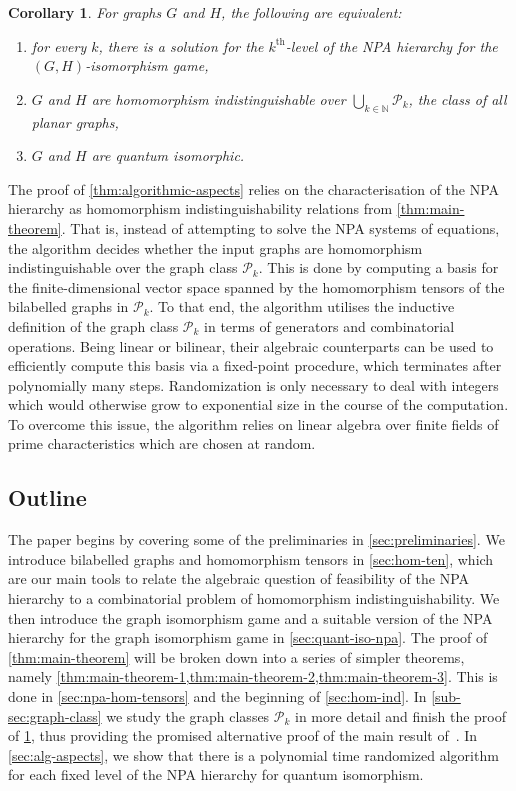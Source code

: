 \documentclass[11pt,a4paper]{article}
\theoremstyle{plain}
\newtheorem{cor}[thm]{Corollary}
\theoremstyle{remark}
\theoremstyle{definition}
\def\calP{{\mathcal P}} \def\calQ{{\mathcal Q}} \def\calR{{\mathcal R}}
\begin{document}
\begin{cor}\label{thm:quant-iso}
	For graphs $G$ and $H$, the following are equivalent:
	\begin{enumerate}
		\item for every $k$, there is a solution for the $k^{\text{th}}$-level of the NPA hierarchy for the $(G,H)$-isomor\-phism game,
		\item $G$ and $H$ are homomorphism indistinguishable over $\bigcup_{k \in \mathbb{N}} \mathcal{P}_k$, the class of all planar graphs,
		\item $G$ and $H$ are quantum isomorphic.
	\end{enumerate}
\end{cor}

The proof of \cref{thm:algorithmic-aspects} relies on the characterisation of the NPA hierarchy as homomorphism indistinguishability relations from \cref{thm:main-theorem}.
That is, instead of attempting to solve the NPA systems of equations, the algorithm decides whether the input graphs are homomorphism indistinguishable over the graph class $\mathcal{P}_k$.
This is done by computing a basis for the finite-dimensional vector space spanned by the homomorphism tensors of the bilabelled graphs in $\mathcal{P}_k$. To that end, the algorithm utilises the inductive definition of the graph class $\mathcal{P}_k$ in terms of generators and combinatorial operations. 
Being linear or bilinear, their algebraic counterparts can be used to efficiently compute this basis via a fixed-point procedure, which terminates after polynomially many steps. 
Randomization is only necessary to deal with integers which would otherwise grow to exponential size in the course of the computation.
To overcome this issue, the algorithm relies on linear algebra over finite fields of prime characteristics which are chosen at random.

\subsection{Outline}
The paper begins by covering some of the preliminaries in \cref{sec:preliminaries}. We introduce bilabelled graphs and homomorphism tensors in \cref{sec:hom-ten}, which are our main tools to relate the algebraic question of feasibility of the NPA hierarchy to a combinatorial problem of homomorphism indistinguishability. We then introduce the graph isomorphism game and a suitable version of the NPA hierarchy for the graph isomorphism game in \cref{sec:quant-iso-npa}. The proof of \cref{thm:main-theorem} will be broken down into a series of simpler theorems, namely \cref{thm:main-theorem-1,thm:main-theorem-2,thm:main-theorem-3}. 
This is done in \cref{sec:npa-hom-tensors} and the beginning of \cref{sec:hom-ind}. In \cref{sub-sec:graph-class} we study the graph classes $\calP_k$ in more detail and finish the proof of \cref{thm:quant-iso}, thus providing the promised alternative proof of the main result of~\cite{david-laura}. In \cref{sec:alg-aspects}, we show that there is a polynomial time randomized algorithm for each fixed level of the NPA hierarchy for quantum isomorphism.
\end{document}
